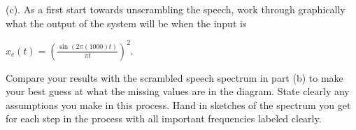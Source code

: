 (c). As a first start towards unscrambling the speech, work through graphically what the output of the system will be when the input is 

\begin{center}
$ x_c(t) = (\frac{\sin(2 \pi (1000) t)}{\pi t})^2 $. 
\end{center}

Compare your results with the scrambled speech spectrum in part (b) to make your best guess at what the missing values are in the diagram. State clearly any assumptions you make in this process. Hand in sketches of the spectrum you get for each step in the process with all important frequencies labeled clearly.
